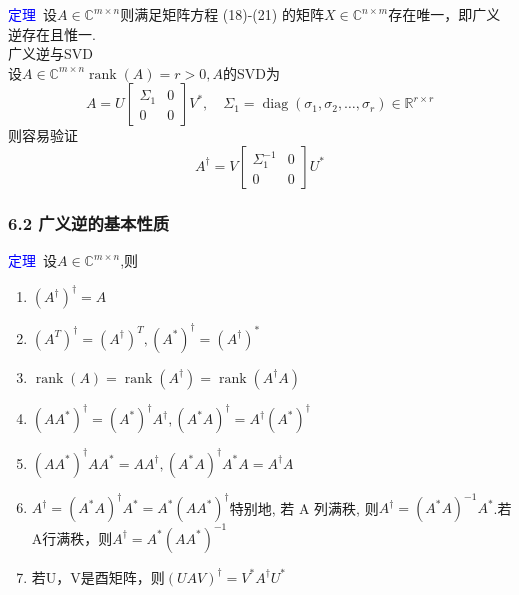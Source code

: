 \documentclass[notheorems,serif]{beamer}
\begin{document}
\begin{frame}
\textcolor{blue}{定理}~设$A \in \mathbb{C}^{m \times n}$则满足矩阵方程 (18)-(21) 的矩阵$X \in \mathbb{C}^{n \times m}$存在唯一，即广义逆存在且惟一.\\

广义逆与SVD\\
设$A \in \mathbb{C}^{m \times n}\operatorname{rank}(A)=r>0, A$的SVD为
$$
A=U\left[\begin{array}{cc}{\Sigma_{1}} & {0} \\ {0} & {0}\end{array}\right] V^{*}, \quad \Sigma_{1}=\operatorname{diag}\left(\sigma_{1}, \sigma_{2}, \ldots, \sigma_{r}\right) \in \mathbb{R}^{r \times r}
$$
则容易验证
$$
A^{\dagger}=V\left[\begin{array}{cc}{\Sigma_{1}^{-1}} & {0} \\ {0} & {0}\end{array}\right] U^{*}
$$
\end{frame}

\begin{frame}
\frametitle{6.2 广义逆的基本性质}
\noindent \textcolor{blue}{定理}~设$A \in \mathbb{C}^{m \times n}$,则\begin{enumerate}[(1)]
	\item $(A^{\dagger})^{\dagger}=A$
	\item $(A^{T})^{\dagger}=(A^{\dagger})^{T},(A^{*})^{\dagger}=(A^{\dagger})^{*}$
	\item $\operatorname{rank}(A)=\operatorname{rank}\left(A^{\dagger}\right)=\operatorname{rank}\left(A^{\dagger} A\right)$
	\item $\left(A A^{*}\right)^{\dagger}=\left(A^{*}\right)^{\dagger} A^{\dagger},\left(A^{*} A\right)^{\dagger}=A^{\dagger}\left(A^{*}\right)^{\dagger}$
	\item $\left(A A^{*}\right)^{\dagger} A A^{*}=A A^{\dagger},\left(A^{*} A\right)^{\dagger} A^{*} A=A^{\dagger} A$
	\item $A^{\dagger}=\left(A^{*} A\right)^{\dagger} A^{*}=A^{*}\left(A A^{*}\right)^{\dagger}$特别地, 若 A 列满秩, 则$A^{\dagger}=\left(A^{*} A\right)^{-1} A^{*}$.若A行满秩，则$A^{\dagger}=A^{*}\left(A A^{*}\right)^{-1}$
	\item 若U，V是酉矩阵，则$(U A V)^{\dagger}=V^{*} A^{\dagger} U^{*}$
\end{enumerate}
\end{frame}
\end{document}

